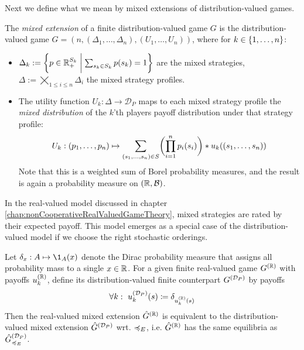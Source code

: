 \documentclass[a4paper]{scrreprt}
\newcommand{\Rp}{\mathbb{R}_+}
\newcommand{\B}{\mathcal{B}}
\newcommand{\D}{\mathcal{D}}
\begin{document}
    Next we define what we mean by mixed extensions of distribution-valued games.
    \begin{defn}
        The \emph{mixed extension} of a finite distribution-valued game $G$ is the distribution-valued game $\hat{G} = (n, (\Delta_1, \dots, \Delta_n), (U_1, \dots, U_n))$,
        where for $k \in \{1, \dots, n\}$:        
        \begin{itemize} %
            \item $\Delta_k := \biggset{ p \in \Rp^{S_k} \biggmid \sum_{s_k \in S_k} p(s_k) = 1 } $ are the mixed strategies, $\Delta := \bigtimes\limits_{1\leq i \leq n} \Delta_i$ the mixed strategy profiles.
            
            \item
            The utility function $U_k: \Delta \to \D_P$ maps to each mixed strategy profile the \emph{mixed distribution} of the $k$'th players payoff distribution under that strategy profile:
            \begin{gather}
                U_k: 
                (p_1, \dots, p_n) 
                \mapsto
                \sum_{(s_1, \dots, s_n) \in S} \biggl(\prod_{i=1}^{n} p_i(s_i)\biggr) * u_k( (s_1, \dots, s_n) )
                \label{eq:marginalDistMixedStrategyUtility}
            \end{gather}
            Note that this is a weighted sum of Borel probability measures, and the result is again a probability measure on $(\R, \B)$.
        \end{itemize}
    \end{defn}

    In the real-valued model discussed in chapter \ref{chap:nonCooperativeRealValuedGameTheory}, mixed strategies are rated by their expected payoff. This model emerges as a special case of the distribution-valued model if we choose the right stochastic orderings.
    \begin{ex}
        Let $\delta_x: A \mapsto \1_A(x)$ denote the Dirac probability measure that assigns all probability mass to a single $x \in \mathbb{R}$.
        For a given finite real-valued game $G^{(\mathbb{R})}$ with payoffs $u_k^{(\mathbb{R})}$, define its distribution-valued finite counterpart $G^{(\DP)}$ by payoffs
        \begin{gather*}
            \forall k: ~u_k^{(\DP)}(s) \coloneqq \delta_{u_k^{(\R)}(s)} 
        \end{gather*}
        Then the real-valued mixed extension $\hat{G}^{(\mathbb{R})}$ is equivalent to the distribution-valued mixed extension $\hat{G}^{(\DP)}$ wrt. $\preccurlyeq_E$, i.e. 
        $\hat{G}^{(\mathbb{R})}$ has the same equilibria as $\hat{G}^{(\DP)}_{\leqE}$.
    \end{ex}
\end{document}
